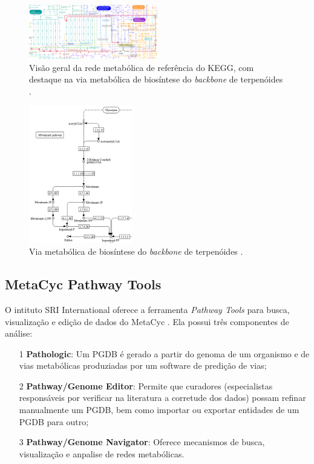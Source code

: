 \documentclass[conference]{IEEEtran}
\begin{document}
\begin{figure}[!t]
\centering
\includegraphics[width=0.5\textwidth]{terpenoid_meva_kegg.png}
\caption{Visão geral da rede metabólica de referência do KEGG, com destaque na via metabólica de biosíntese do \textit{backbone} de terpenóides \cite{RefPathwayKEGG}.}
\label{terpenoid_meva_kegg}
\end{figure}

\begin{figure}[!t]
\centering
\includegraphics[width=0.4\textwidth]{terpenoid_meva_kegg_solo.png}
\caption{Via metabólica de biosíntese do \textit{backbone} de terpenóides \cite{viaTerpenoideKEGG}.}
\label{terpenoid_meva_kegg_solo}
\end{figure}

\subsection{MetaCyc Pathway Tools}

\indent O intituto SRI International oferece a ferramenta \textit{Pathway Tools} para busca, visualização e edição de dados do MetaCyc \cite{articleMetacyc}. Ela possui três componentes de análise:

\begin{itemize}
\item[1]\textbf{Pathologic}: Um PGDB é gerado a partir do genoma de um organismo e de vias metabólicas produziadas por um software de predição de vias; 
\item[2]\textbf{Pathway/Genome Editor}: Permite que curadores (especialistas responsáveis por verificar na literatura a corretude dos dados) possam refinar manualmente um PGDB, bem como importar ou exportar entidades de um PGDB para outro;
\item[3]\textbf{Pathway/Genome Navigator}: Oferece mecanismos de busca, visualização e anpalise de redes metabólicas.
\end{itemize}
\end{document}
